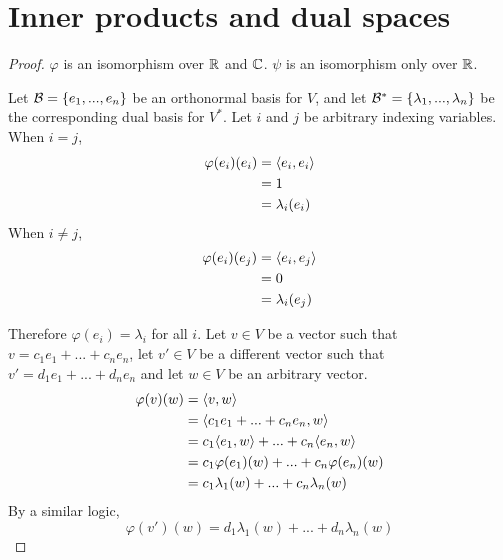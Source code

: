 \section{Inner products and dual spaces}
\begin{proof}
    $\varphi$ is an isomorphism over $\mathbb{R}$ and $\mathbb{C}$.
    $\psi$ is an isomorphism only over $\mathbb{R}$.\gap

    Let $\mathcal{B} = \{e_1,...,e_n\}$ be an orthonormal basis for $V$, and 
    let $\mathcal{B}^* = \{\lambda_1,...,\lambda_n\}$ be the corresponding dual basis for $V^*$.
    Let $i$ and $j$ be arbitrary indexing variables.\\
    When $i=j$,
    \begin{align*}
        \varphi(e_i)(e_i)
        &= \langle e_i, e_i \rangle\\
        &= 1\\
        &= \lambda_i(e_i)\\
    \end{align*}
    When $i \neq j$,
    \begin{align*}
        \varphi(e_i)(e_j)
        &= \langle e_i, e_j \rangle\\
        &= 0\\
        &= \lambda_i(e_j)\\
    \end{align*}\gap

    Therefore $\varphi(e_i) = \lambda_i$ for all $i$.
    Let $v \in V$ be a vector such that $v = c_1e_1 + ... + c_ne_n$, 
    let $v' \in V$ be a different vector such that $v' = d_1e_1 + ... + d_ne_n$
    and let $w \in V$ be an arbitrary vector.
    \begin{align*}
        \varphi(v)(w)
        &= \langle v, w \rangle\\
        &= \langle c_1e_1 + ... + c_ne_n, w \rangle\\
        &= c_1\langle e_1, w \rangle + ... + c_n\langle e_n, w \rangle\\
        &= c_1\varphi(e_1)(w) + ... + c_n\varphi(e_n)(w)\\
        &= c_1\lambda_1(w) + ... + c_n\lambda_n(w)\\
    \end{align*}\gap
    By a similar logic,
    \[
        \varphi(v')(w) = d_1\lambda_1(w) + ... + d_n\lambda_n(w)
    \]


\end{proof}
